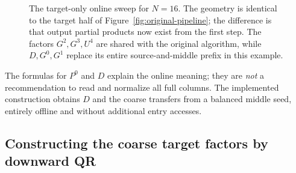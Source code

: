 \documentclass[11pt]{article}
\begin{document}
\begin{figure}[htbp]
\centering
{}
\caption{The target-only online sweep for $N=16$.  The geometry is identical to the target half of Figure~\ref{fig:original-pipeline}; the difference is that output partial products now exist from the first step.  The factors $G^2,G^3,U^4$ are shared with the original algorithm, while $D,G^0,G^1$ replace its entire source-and-middle prefix in this example.}
\label{fig:target-only-pipeline}
\end{figure}

The formulas for $P^0$ and $D$ explain the online meaning; they are \emph{not} a recommendation to read and normalize all full columns.  The implemented construction obtains $D$ and the coarse transfers from a balanced middle seed, entirely offline and without additional entry accesses.

\subsection{Constructing the coarse target factors by downward QR}
\label{sec:qr-descent}
\end{document}
